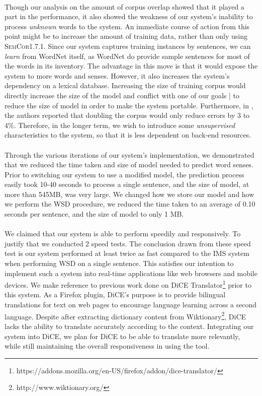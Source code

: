 \paragraph{}
Though our analysis on the amount of corpus overlap showed that it played a part in the performance, it also showed the weakness of our system's inability to process \textit{unknown} words to the system. An immediate course of action from this point might be to increase the amount of training data, rather than only using \textsc{SemCor1.7.1}. Since our system captures training instances by sentences, we can \textit{learn} from WordNet itself, as WordNet do provide sample sentences for most of the words in its inventory. The advantage in this move is that it would expose the system to more words and senses. However, it also increases the system's dependency on a lexical database. Increasing the size of training corpus would directly increase the size of the model and conflict with one of our goals | to reduce the size of model in order to make the system portable. Furthermore, in \cite{yarowsky}, the authors reported that doubling the corpus would only reduce errors by 3 to 4\%. Therefore, in the longer term, we wish to introduce some \textit{unsupervised} characteristics to the system, so that it is less dependent on back-end resources.

\paragraph{}
Through the various iterations of our system's implementation, we demonstrated that we reduced the time taken and size of model needed to predict word senses. Prior to switching our system to use a modified model, the prediction process easily took 10-40 seconds to process a single sentence, and the size of model, at more than 545MB, was very large. We changed how we store our model and how we perform the WSD procedure, we reduced the time taken to an average of 0.10 seconds per sentence, and the size of model to only 1 MB.

\paragraph{}
We claimed that our system is able to perform speedily and responsively. To justify that we conducted 2 speed tests. The conclusion drawn from these speed test is our system performed at least twice as fast compared to the IMS system when performing WSD on a single sentence. This satisfies our intention to implement such a system into real-time applications like web browsers and mobile devices. We make reference to previous work done on DiCE Translator\footnote{https://addons.mozilla.org/en-US/firefox/addon/dice-translator/} prior to this system. As a Firefox plugin, DiCE's purpose is to provide bilingual translations for text on web pages to encourage language learning across a second language. Despite after extracting dictionary content from Wiktionary\footnote{http://www.wiktionary.org/}, DiCE lacks the ability to translate accurately according to the context. Integrating our system into DiCE, we plan for DiCE to be able to translate more relevantly, while still maintaining the overall responsiveness in using the tool.

